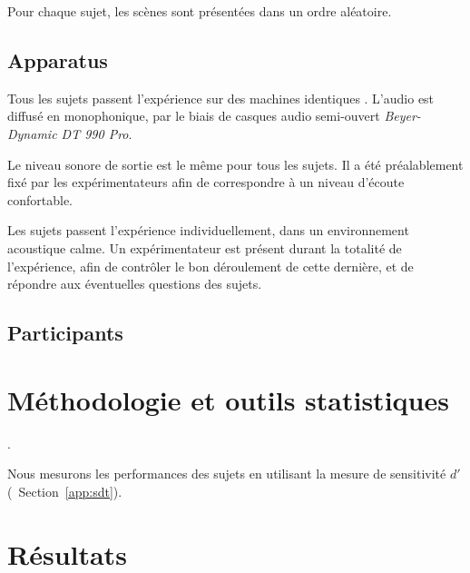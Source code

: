 Pour chaque sujet, les scènes sont présentées dans un ordre aléatoire. 

\subsection{Apparatus}

Tous les sujets passent l'expérience sur des machines identiques . L'audio est diffusé en monophonique, par le biais de casques audio semi-ouvert \emph{Beyer-Dynamic DT 990 Pro}. 

Le niveau sonore de sortie est le même pour tous les sujets. Il a été préalablement fixé par les expérimentateurs afin de correspondre à un niveau d'écoute confortable.

Les sujets passent l'expérience individuellement, dans un environnement acoustique calme. Un expérimentateur est présent durant la totalité de l'expérience, afin de contrôler le bon déroulement de cette dernière, et de répondre aux éventuelles questions des sujets.

\subsection{Participants}


\section{Méthodologie et outils statistiques}

.

Nous mesurons les performances des sujets en utilisant la mesure de sensitivité $d'$ (\cf~Section~\ref{app:sdt}).
 
\section{Résultats}

